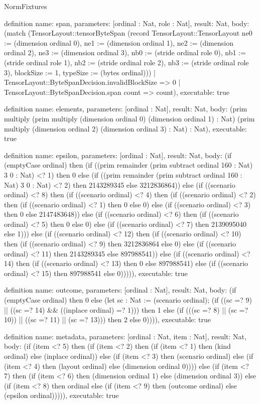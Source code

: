 \begin{lexlean}{NormFixtures}
\begin{semanticmodule}
definition{
  name: span,
  parameters: [ordinal : Nat, role : Nat],
  result: Nat,
  body: (match (TensorLayout::tensorByteSpan (record TensorLayout::TensorLayout {ne0 := (dimension ordinal 0), ne1 := (dimension ordinal 1), ne2 := (dimension ordinal 2), ne3 := (dimension ordinal 3), nb0 := (stride ordinal role 0), nb1 := (stride ordinal role 1), nb2 := (stride ordinal role 2), nb3 := (stride ordinal role 3), blockSize := 1, typeSize := (bytes ordinal)}))
    | TensorLayout::ByteSpanDecision.invalidBlockSize => 0
    | TensorLayout::ByteSpanDecision.span count => count),
  executable: true
}

definition{
  name: elements,
  parameters: [ordinal : Nat],
  result: Nat,
  body: (prim multiply (prim multiply (dimension ordinal 0) (dimension ordinal 1) : Nat) (prim multiply (dimension ordinal 2) (dimension ordinal 3) : Nat) : Nat),
  executable: true
}

definition{
  name: epsilon,
  parameters: [ordinal : Nat],
  result: Nat,
  body: (if (emptyCase ordinal) then (if ((prim remainder (prim subtract ordinal 160 : Nat) 3 0 : Nat) <? 1) then 0 else (if ((prim remainder (prim subtract ordinal 160 : Nat) 3 0 : Nat) <? 2) then 2143289345 else 3212836864)) else (if ((scenario ordinal) <? 8) then (if ((scenario ordinal) <? 4) then (if ((scenario ordinal) <? 2) then (if ((scenario ordinal) <? 1) then 0 else 0) else (if ((scenario ordinal) <? 3) then 0 else 2147483648)) else (if ((scenario ordinal) <? 6) then (if ((scenario ordinal) <? 5) then 0 else 0) else (if ((scenario ordinal) <? 7) then 2139095040 else 1))) else (if ((scenario ordinal) <? 12) then (if ((scenario ordinal) <? 10) then (if ((scenario ordinal) <? 9) then 3212836864 else 0) else (if ((scenario ordinal) <? 11) then 2143289345 else 897988541)) else (if ((scenario ordinal) <? 14) then (if ((scenario ordinal) <? 13) then 0 else 897988541) else (if ((scenario ordinal) <? 15) then 897988541 else 0))))),
  executable: true
}

definition{
  name: outcome,
  parameters: [ordinal : Nat],
  result: Nat,
  body: (if (emptyCase ordinal) then 0 else (let sc : Nat := (scenario ordinal); (if ((sc =? 9) || ((sc =? 14) && ((inplace ordinal) =? 1))) then 1 else (if (((sc =? 8) || (sc =? 10)) || ((sc =? 11) || (sc =? 13))) then 2 else 0)))),
  executable: true
}

definition{
  name: metadata,
  parameters: [ordinal : Nat, item : Nat],
  result: Nat,
  body: (if (item <? 5) then (if (item <? 2) then (if (item <? 1) then (kind ordinal) else (inplace ordinal)) else (if (item <? 3) then (scenario ordinal) else (if (item <? 4) then (layout ordinal) else (dimension ordinal 0)))) else (if (item <? 7) then (if (item <? 6) then (dimension ordinal 1) else (dimension ordinal 3)) else (if (item <? 8) then ordinal else (if (item <? 9) then (outcome ordinal) else (epsilon ordinal))))),
  executable: true
}


\end{semanticmodule}
\end{lexlean}
